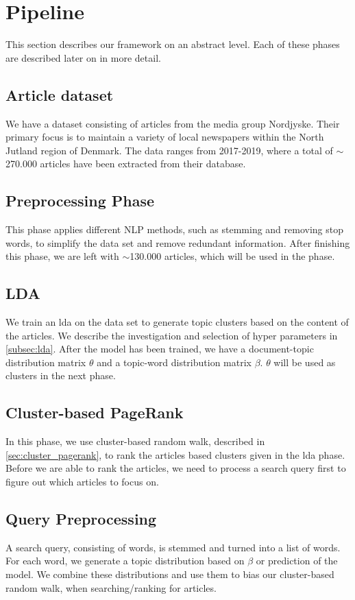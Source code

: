 \section{Pipeline}
This section describes our framework on an abstract level.
Each of these phases are described later on in more detail. 

\subsection{Article dataset}
We have a dataset consisting of articles from the media group Nordjyske. Their primary focus is to maintain a variety of local newspapers within the North Jutland region of Denmark. 
The data ranges from 2017-2019, where a total of $\sim$270.000 articles have been extracted from their database.

\subsection{Preprocessing Phase}
This phase applies different \gls{NLP} methods, such as stemming and removing stop words, to simplify the data set and remove redundant information.
After finishing this phase, we are left with $\sim$130.000 articles, which will be used in the phase.

\subsection{LDA}
We train an \acrfull{lda} on the data set to generate topic clusters based on the content of the articles. 
We describe the investigation and selection of hyper parameters in \autoref{subsec:lda}. 
After the model has been trained, we have a document-topic distribution matrix $\theta$ and a topic-word distribution matrix $\beta$.
$\theta$ will be used as clusters in the next phase.

\subsection{Cluster-based PageRank}
In this phase, we use cluster-based random walk, described in \autoref{sec:cluster_pagerank}, to rank the articles based clusters given in the \gls{lda} phase.
Before we are able to rank the articles, we need to process a search query first to figure out which articles to focus on.


\subsection{Query Preprocessing}
A search query, consisting of words, is stemmed and turned into a list of words.
For each word, we generate a topic distribution based on $\beta$ or prediction of the model.
We combine these distributions and use them to bias our cluster-based random walk, when searching/ranking for articles.

%
